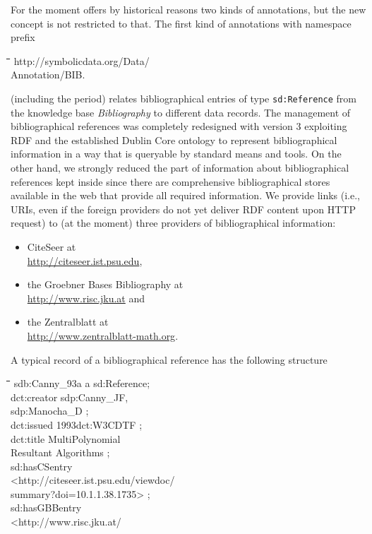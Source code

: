 \documentclass[a4paper,11pt]{article}
\newenvironment{code}{\par\small\tt\footnotesize \begin{tabbing}
\hskip12pt\=\hskip12pt\=\hskip12pt\=\hskip12pt\=\hskip5cm\=\hskip5cm\=\kill}
{\end{tabbing}\normalsize}
\newcommand{\xsdprefix}{\char94\char94} %
\begin{document}
\begin{multicols}{2}
For the moment {\SD} offers by historical reasons two kinds of annotations, but
the new concept is not restricted to that. The first kind of annotations with
namespace prefix 
\begin{code}
  http://symbolicdata.org/Data/\\\>\> Annotation/BIB.
\end{code}
(including the period) relates bibliographical entries of type
\texttt{sd:Reference} from the {\SD} knowledge base \emph{Bibliography} to
different data records.  The management of bibliographical references was
completely redesigned with {\SD} version 3 exploiting RDF and the established
Dublin Core ontology \cite{dcterms} to represent bibliographical information in
a way that is queryable by standard means and tools. On the other hand, we
strongly reduced the part of information about bibliographical references kept
inside {\SD} since there are comprehensive bibliographical stores available in
the web that provide all required information.  We provide links (i.e., URIs,
even if the foreign providers do not yet deliver RDF content upon HTTP request)
to (at the moment) three providers of bibliographical information:
\begin{itemize}
\item CiteSeer at\\ \url{http://citeseer.ist.psu.edu},
\item the Groebner Bases Bibliography at\\ \url{http://www.risc.jku.at} and
\item the Zentralblatt at\\ \url{http://www.zentralblatt-math.org}. 
\end{itemize}
A typical record of a bibliographical reference has the following structure
\begin{code}
  sdb:Canny\_93a a sd:Reference; \+\\
  dct:creator sdp:Canny\_JF,\\\>\> sdp:Manocha\_D ;\\
  dct:issued {\dq}1993{\dq}{\xsdprefix}dct:W3CDTF ;\\
  dct:title  {\dq}MultiPolynomial\\\>\> Resultant Algorithms{\dq} ;\\
  sd:hasCSentry\\\>  <http://citeseer.ist.psu.edu/viewdoc/\\\>\>
  summary?doi=10.1.1.38.1735> ;\\   
  sd:hasGBBentry\\\> <http://www.risc.jku.at/\\\>\>

\end{code}
\end{multicols}
\end{document}
